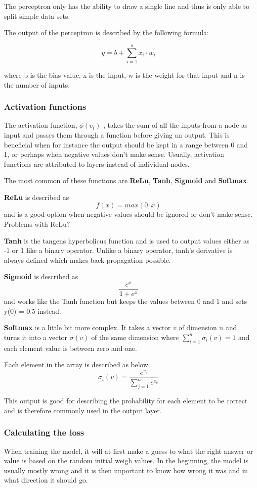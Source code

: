 The perceptron only has the ability to draw a single line and thus is only able to split simple data sets.

The output of the perceptron is described by the following formula:

\[ y = b + \displaystyle\sum_{i=1}^{n} x_i \cdot w_i \]

where b is the bias value, x is the input, w is the weight for that input and n is the number of inputs.

\subsubsection{Activation functions}

The activation function,  $ \phi (v_{i}) $ , takes the sum of all the inputs from a node as input and passes them through a function before giving an output. This is beneficial when for instance the output should be kept in a range between 0 and 1, or perhaps when negative values don't make sense.
Usually, activation functions are attributed to layers instead of individual nodes.

The most common of these functions are \textbf{ReLu}, \textbf{Tanh}, \textbf{Sigmoid} and \textbf{Softmax}.

\textbf{ReLu} is described as
\[f(x) = max(0, x)\]
and is a good option when negative values should be ignored or don't make sense. Problems with ReLu?

\textbf{Tanh} is the tangens hyperbolicus function and is used to output values either as -1 or 1 like a binary operator. Unlike a binary operator, tanh's derivative is always defined which makes back propagation possible.

\textbf{Sigmoid} is described as 
\[\frac{e^x}{1+e^x}\]
and works like the Tanh function but keeps the values between 0 and 1 and sets y(0) = 0.5 instead.

\textbf{Softmax} is a little bit more complex. It takes a vector $v$ of dimension $n$ and turns it into a vector $\sigma(v)$ of the same dimension where $\displaystyle\sum_{i=1}^{n} \sigma_i(v) = 1 $ and each element value is between zero and one.

Each element in the array is described as below
\[ \sigma_i(v) = \frac{e^{v_i}}{\displaystyle\sum_{j=1}^{n} e^{z_k}} \]

This output is good for describing the probability for each element to be correct and is therefore commonly used
in the output layer.

\subsubsection{Calculating the loss}
When training the model, it will at first make a guess to what the right answer or value is based on the random initial weigh values. In the beginning, the model is usually mostly wrong and it is then important to know how wrong it was and in what direction it should go.

